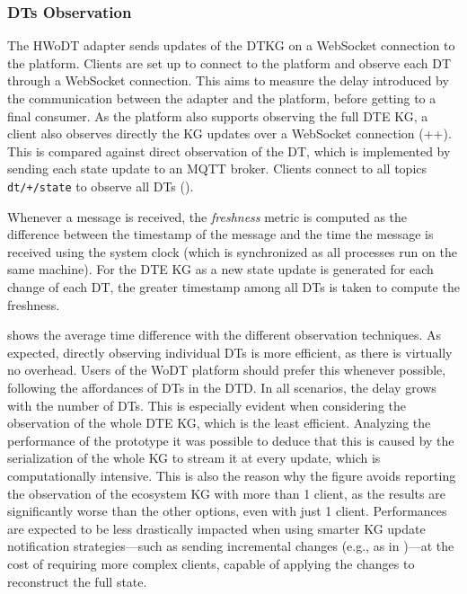 \subsubsection{\aclp{DT} Observation}

The \ac{HWoDT} adapter sends updates of the \ac{DTKG} on a WebSocket connection to the platform. Clients are set up to connect to the platform and observe each \ac{DT} through a WebSocket connection.
This aims to measure the delay introduced by the communication between the adapter and the platform, before getting to a final consumer. 
%
As the platform also supports observing the full \ac{DTE} \ac{KG}, a client also observes directly the \ac{KG} updates over a WebSocket connection (++).
%
This is compared against direct observation of the \ac{DT}, which is implemented by sending each state update to an MQTT broker. Clients connect to all topics \texttt{dt/+/state} to observe all \acp{DT} ().

Whenever a message is received, the \emph{freshness} metric is computed as the difference between the timestamp of the message and the time the message is received using the system clock (which is synchronized as all processes run on the same machine). 
%
For the \ac{DTE} \ac{KG} as a new state update is generated for each change of each \ac{DT}, the greater timestamp among all \acp{DT} is taken to compute the freshness.

 shows the average time difference with the different observation techniques. 
As expected, directly observing individual \acp{DT} is more efficient, as there is virtually no overhead. Users of the \ac{WoDT} platform should prefer this whenever possible, following the affordances of \acp{DT} in the \ac{DTD}.
%
In all scenarios, the delay grows with the number of \acp{DT}. This is especially evident when considering the observation of the whole \ac{DTE} \ac{KG}, which is the least efficient. Analyzing the performance of the prototype it was possible to deduce that this is caused by the serialization of the whole \ac{KG} to stream it at every update, which is computationally intensive. 
%
This is also the reason why the figure avoids reporting the observation of the ecosystem \ac{KG} with more than 1 client, as the results are significantly worse than the other options, even with just 1 client.
Performances are expected to be less drastically impacted when using smarter \ac{KG} update notification strategies---such as sending incremental changes (e.g., as in \cite{roffia2018fi})---at the cost of requiring more complex clients, capable of applying the changes to reconstruct the full state.

